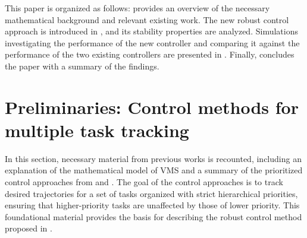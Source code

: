 \documentclass[../main.tex]{subfiles}
\begin{document}
This paper is organized as follows:  provides an overview of the necessary mathematical background and relevant existing work. The new robust control approach is introduced in , and its stability properties are analyzed. Simulations investigating the performance of the new controller and comparing it against the performance of the two existing controllers are presented in . Finally,  concludes the paper with a summary of the findings.


\section{Preliminaries: Control methods for multiple task tracking}\label{sec:prelims}

In this section, necessary material from previous works is recounted, including an explanation of the mathematical model of VMS and a summary of the prioritized control approaches from \cite{Garofalo2020} and \cite{Saeboe2022}. The goal of the control approaches is to track desired trajectories for a set of tasks organized with strict hierarchical priorities, ensuring that higher-priority tasks are unaffected by those of lower priority. This foundational material provides the basis for describing the robust control method proposed in .

\end{document}
